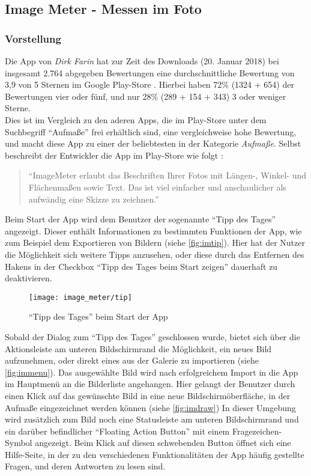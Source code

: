 \subsection{Image Meter - Messen im Foto}

\subsubsection{Vorstellung}
Die App \im{} von \emph{Dirk Farin} hat zur Zeit des Downloads (20. Januar 2018) bei insgesamt 2.764 abgegeben Bewertungen eine durchschnittliche Bewertung von 3,9 von 5 Sternen im Google Play-Store \citep{FarinIM}.
Hierbei haben 72\% (1324 + 654) der Bewertungen vier oder fünf, und nur 28\% (289 + 154 + 343) 3 oder weniger Sterne. \\
Dies ist im Vergleich zu den aderen Apps, die im Play-Store unter dem Suchbegriff ``Aufmaße'' frei erhältlich sind, eine vergleichweise hohe Bewertung, und macht diese App zu einer der beliebtesten in der Kategorie \emph{Aufmaße}.
Selbst beschreibt der Entwickler die App im Play-Store wie folgt \citep{FarinIM}:

\begin{quote}
  ``ImageMeter erlaubt das Beschriften Ihrer Fotos mit Längen-, Winkel- und Flächenmaßen sowie Text.
  Das ist viel einfacher und anschaulicher als aufwändig eine Skizze zu zeichnen.''
\end{quote}

\noindent
Beim Start der App wird dem Benutzer der sogenannte ``Tipp des Tages'' angezeigt. 
Dieser enthält Informationen zu bestimmten Funktionen der App, wie zum Beispiel dem Exportieren von Bildern (siehe \autoref{fig:imtip}).
Hier hat der Nutzer die Möglichkeit sich weitere Tipps anzusehen, oder diese durch das Entfernen des Hakens in der Checkbox ``Tipp des Tages beim Start zeigen'' dauerhaft zu deaktivieren.\\

\begin{wrapfigure}{R}{0.5\textwidth}
  \centering
  \texttt{[image: image\_meter/tip]}
  \caption{``Tipp des Tages'' beim Start der App}
  \label{fig:imtip}
\end{wrapfigure}

Sobald der Dialog zum ``Tipp des Tages'' geschlossen wurde, bietet sich über die Aktionsleiste am unteren Bildschirmrand die Möglichkeit, ein neues Bild aufzunehmen, oder direkt eines aus der Galerie zu importieren (siehe \autoref{fig:immenu}).
Das ausgewählte Bild wird nach erfolgreichem Import in die App im Hauptmenü an die Bilderliste angehangen.
Hier gelangt der Benutzer durch einen Klick auf das gewünschte Bild in eine neue Bildschirmöberfläche, in der Aufmaße eingezeichnet werden können (siehe \autoref{fig:imdraw})
In dieser Umgebung wird zusätzlich zum Bild noch eine Statusleiste am unteren Bildschirmrand und ein darüber befindlicher ``Floating Action Button''  mit einem Fragezeichen-Symbol angezeigt.
Beim Klick auf diesen schwebenden Button öffnet sich eine Hilfe-Seite, in der zu den verschiedenen Funktionalitäten der App häufig gestellte Fragen, und deren Antworten zu lesen sind. \\

